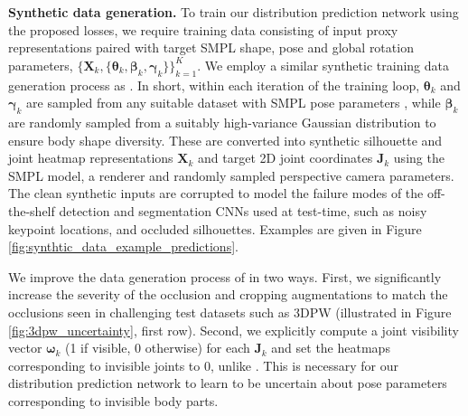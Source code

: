 \documentclass[final]{cvpr}
\begin{document}
\noindent \textbf{Synthetic data generation.} To train our distribution prediction network using the proposed losses, we require training data consisting of input proxy representations paired with target SMPL shape, pose and global rotation parameters, $\{\mathbf{X}_k, \{\boldsymbol{\theta}_k, \boldsymbol{\beta}_k, \boldsymbol{\gamma}_k\}\}_{k=1}^K$. We employ a similar synthetic training data generation process as \cite{STRAPS2020BMVC}. In short, within each iteration of the training loop, $\boldsymbol{\theta}_k$ and $\boldsymbol{\gamma}_k$ are sampled from any suitable dataset with SMPL pose parameters \cite{h36m_pami,Lassner:UP:2017,AMASS:2019,vonMarcard2018}, while $\boldsymbol{\beta}_k$ are randomly sampled from a suitably high-variance Gaussian distribution to ensure body shape diversity. These are converted into synthetic silhouette and joint heatmap representations $\mathbf{X}_k$ and target 2D joint coordinates $\mathbf{J}_{k}$ using the SMPL model, a renderer \cite{kato2018renderer} and randomly sampled perspective camera parameters. The clean synthetic inputs are corrupted to model the failure modes of the off-the-shelf detection and segmentation CNNs used at test-time, such as noisy keypoint locations, and occluded silhouettes. Examples are given in Figure \ref{fig:synthtic_data_example_predictions}. 

We improve the data generation process of \cite{STRAPS2020BMVC} in two ways. First, we significantly increase the severity of the occlusion and cropping augmentations to match the occlusions seen in challenging test datasets such as 3DPW (illustrated in Figure \ref{fig:3dpw_uncertainty}, first row). Second, we explicitly compute a joint visibility vector $\boldsymbol{\omega}_k$ (1 if visible, 0 otherwise) for each $\mathbf{J}_k$ and set the heatmaps corresponding to invisible joints to 0, unlike \cite{STRAPS2020BMVC}. This is necessary for our distribution prediction network to learn to be uncertain about pose parameters corresponding to invisible body parts.
\end{document}
